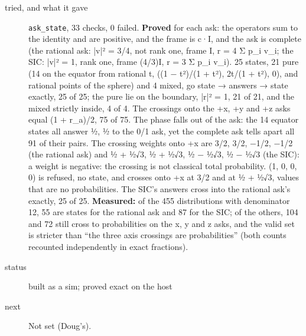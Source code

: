 \begin{description}
\item[{tried, and what it gave}] \texttt{ask\_\allowbreak{}state}, 33 checks, 0 failed. \textbf{Proved} for each ask: the operators sum to the identity and are positive, and the frame is c·I, and the ask is complete (the rational ask: |v|² = 3/4, not rank one, frame I, r = 4 Σ p\_\allowbreak{}i v\_\allowbreak{}i; the SIC: |v|² = 1, rank one, frame (4/3)I, r = 3 Σ p\_\allowbreak{}i v\_\allowbreak{}i). 25 states, 21 pure (14 on the equator from rational t, ((1 − t²)/(1 + t²), 2t/(1 + t²), 0), and rational points of the sphere) and 4 mixed, go state → answers → state exactly, 25 of 25; the pure lie on the boundary, |r|² = 1, 21 of 21, and the mixed strictly inside, 4 of 4. The crossings onto the +x, +y and +z asks equal (1 + r\_\allowbreak{}a)/2, 75 of 75. The phase falls out of the ask: the 14 equator states all answer ½, ½ to the 0/1 ask, yet the complete ask tells apart all 91 of their pairs. The crossing weights onto +x are 3/2, 3/2, −1/2, −1/2 (the rational ask) and ½ + ½√3, ½ + ½√3, ½ − ½√3, ½ − ½√3 (the SIC): a weight is negative: the crossing is not classical total probability. (1, 0, 0, 0) is refused, no state, and crosses onto +x at 3/2 and at ½ + ½√3, values that are no probabilities. The SIC's answers cross into the rational ask's exactly, 25 of 25. \textbf{Measured:} of the 455 distributions with denominator 12, 55 are states for the rational ask and 87 for the SIC; of the others, 104 and 72 still cross to probabilities on the x, y and z asks, and the valid set is stricter than “the three axis crossings are probabilities” (both counts recounted independently in exact fractions).
\item[{status}] built as a sim; proved exact on the host
\item[{next}] Not set (Doug's).
\end{description}


